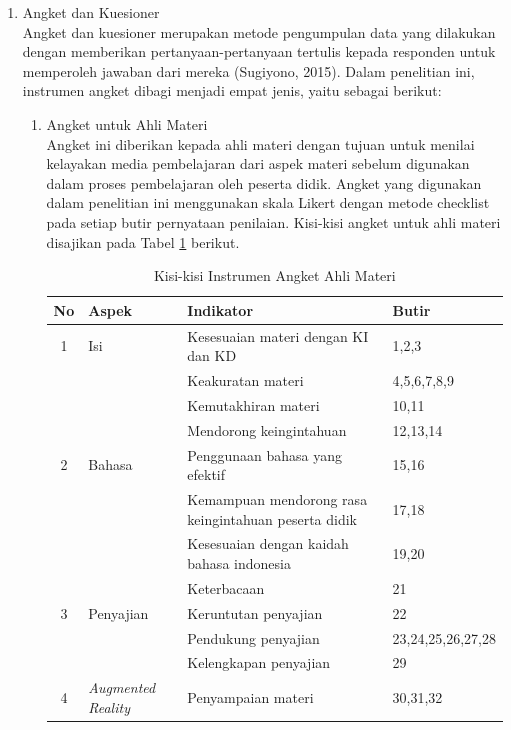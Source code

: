 \documentclass[12pt]{article}
\begin{document}
\begin{enumerate}
\begin{enumerate}
        \item Angket dan Kuesioner\\
        \hspace*{1cm}Angket dan kuesioner merupakan metode pengumpulan data yang dilakukan dengan memberikan pertanyaan-pertanyaan tertulis kepada responden untuk memperoleh jawaban dari mereka (Sugiyono, 2015). Dalam penelitian ini, instrumen angket dibagi menjadi empat jenis, yaitu sebagai berikut:
        \begin{enumerate}
            \item Angket untuk Ahli Materi\\
            \hspace*{1cm}Angket ini diberikan kepada ahli materi dengan tujuan untuk menilai kelayakan media pembelajaran dari aspek materi sebelum digunakan dalam proses pembelajaran oleh peserta didik. Angket yang digunakan dalam penelitian ini menggunakan skala Likert dengan metode checklist pada setiap butir pernyataan penilaian. Kisi-kisi angket untuk ahli materi disajikan pada Tabel \ref{kisiahlimateri} berikut.
            \begin{table}[H]
                \centering
                \caption{Kisi-kisi Instrumen Angket Ahli Materi}
                \label{kisiahlimateri}
                \begin{tabular}{|c|p{3cm}|p{7cm}|p{3cm}|}
                    \hline
                    \textbf{No} & \textbf{Aspek} & \textbf{Indikator} & \textbf{Butir}\\
                    \hline
                    1 & Isi & Kesesuaian materi dengan KI dan KD & 1,2,3\\
                    & & Keakuratan materi & 4,5,6,7,8,9\\
                    & & Kemutakhiran materi & 10,11\\
                    & & Mendorong keingintahuan & 12,13,14\\
                    \hline
                    2 & Bahasa & Penggunaan bahasa yang efektif & 15,16\\
                    & & Kemampuan mendorong rasa keingintahuan peserta didik & 17,18\\
                    & & Kesesuaian dengan kaidah bahasa indonesia & 19,20\\
                    & & Keterbacaan & 21\\
                    \hline
                    3 & Penyajian & Keruntutan penyajian & 22\\
                    & & Pendukung penyajian & 23,24,25,26,27,28\\
                    & & Kelengkapan penyajian & 29\\
                    \hline
                    4 & \textit{Augmented Reality} & Penyampaian materi & 30,31,32\\
                    \hline
                    


\end{tabular}
\end{table}
\end{enumerate}
\end{enumerate}
\end{enumerate}
\end{document}
